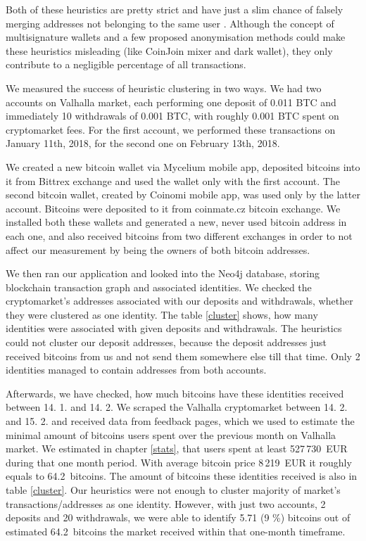 \documentclass[
  digital, %
  table,   %
  lof,     %
  lot,     %
  oneside
]{fithesis3}
\begin{document}
Both of these heuristics are pretty strict and have just a slim chance of falsely merging
addresses not belonging to the same user \parencite{androulaki2013evaluating}.
Although the concept of multisignature wallets and a few proposed anonymisation methods could make
these heuristics misleading (like CoinJoin mixer and dark wallet), they only contribute to a negligible percentage of all transactions.

We measured the success of heuristic clustering in two ways.
We had two accounts on Valhalla market, each performing one deposit of 0.011 BTC and immediately 10 withdrawals of
0.001 BTC, with roughly 0.001 BTC spent on cryptomarket fees.
For the first account, we performed these transactions on January 11th, 2018, for the second one on February 13th, 2018.

We created a new bitcoin wallet via Mycelium mobile app, deposited bitcoins into it
from Bittrex exchange and used the wallet only with the first account.
The second bitcoin wallet, created by Coinomi mobile app, was used only by the latter account. 
Bitcoins were deposited to it from coinmate.cz bitcoin exchange.
We installed both these wallets and generated a new, never used bitcoin address in each one, and also
received bitcoins from two different exchanges in order to not affect
our measurement by being the owners of both bitcoin addresses.

We then ran our application and looked into the Neo4j database, storing
blockchain transaction graph and associated identities.
We checked the cryptomarket's addresses associated with our deposits and withdrawals,
whether they were clustered as one identity. The table \ref{cluster} shows, how many identities
were associated with given deposits and withdrawals. The heuristics could not cluster our
deposit addresses, because the deposit addresses just received bitcoins from us and not send them
somewhere else till that time. Only 2 identities managed to contain addresses from both accounts.

Afterwards, we have checked, how much bitcoins have these
identities received between 14. 1. and 14. 2. We scraped the Valhalla cryptomarket between 14. 2. and 15. 2.
and received data from feedback pages, which we used to estimate the minimal amount of bitcoins users spent over the previous month on Valhalla market.
We estimated in chapter \ref{stats}, that users spent at least 527\,730~EUR during that one month period.
With average bitcoin price 8\,219~EUR it roughly equals to 64.2~bitcoins.
The amount of bitcoins these identities received is also in table \ref{cluster}.
Our heuristics were not enough to cluster majority of market's transactions/addresses as one identity.
However, with just two accounts, 2 deposits and 20 withdrawals, we were able to identify 5.71 (9 \%) bitcoins out of estimated
\mbox{64.2~bitcoins} the market received within that one-month timeframe.
\end{document}

